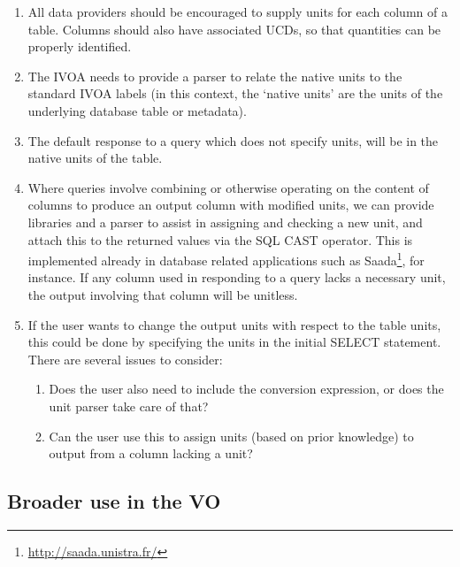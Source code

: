 \documentclass[11pt,notitlepage,onecolumn]{ivoa}
\begin{document}
\begin{enumerate}
\item All data providers should be encouraged to supply units for each column
of a table. Columns should also have associated UCDs, so that quantities can be
properly identified.

\item The IVOA needs to provide a parser to relate the native units to the standard IVOA
labels (in this context, the `native units' are the units of the
underlying database table or metadata).   

\item
The default response to a query which does not specify units, will be
in the native units of the table. 

\item
Where queries involve combining or otherwise operating on the content
of columns to produce an output column with modified units, we can
provide libraries and a parser to assist in assigning and checking a
new unit, and attach this to the returned values via the SQL CAST
operator. 
This is implemented already in database related applications such as 
Saada\footnote{\url{http://saada.unistra.fr/}}, for instance. 
If any column used in responding to a query lacks a necessary unit, the output
involving that column will be unitless.

\item
If the user wants to change the output units with respect to the table
units, this could be done by specifying the units in the initial
SELECT statement. There are several issues to consider: 
	\begin{enumerate}
	\item Does the user also need to include the conversion expression, or does the unit
parser take care of that?  
	\item Can the user use this to assign units (based on prior knowledge) to output from a 
column lacking a unit?
	\end{enumerate}
\end{enumerate} 


\subsection{Broader use in the VO}
\end{document}
